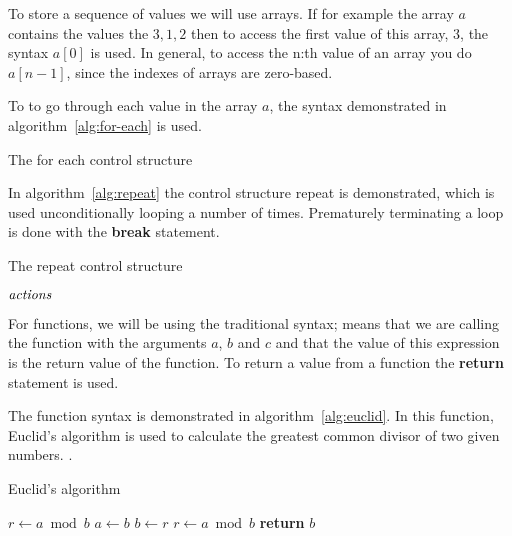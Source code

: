 To store a sequence of values we will use arrays. If for example the
array $a$ contains the values the $3,1,2$ then to access the first
value of this array, $3$, the syntax $a[0]$ is used. In general, to
access the n:th value of an array you do $a[n-1]$, since the indexes
of arrays are zero-based.

To to go through each value in the array $a$, the syntax demonstrated
in algorithm~\ref{alg:for-each} is used.

\begin{algorithm}[H]
  \caption{The for each control structure}
  \label{alg:for-each}
  \begin{algorithmic}[1]
    \EndForEach
  \end{algorithmic}
\end{algorithm}

In algorithm~\ref{alg:repeat} the control structure repeat is
demonstrated, which is used unconditionally looping a number of
times. Prematurely terminating a loop is done with the \textbf{break}
statement.

\begin{algorithm}[H]
  \caption{The repeat control structure}
  \label{alg:repeat}
  \begin{algorithmic}[1]
    \State $\mathit{actions}$ 
    \EndRepeatn
  \end{algorithmic}
\end{algorithm}

For functions, we will be using the traditional syntax;
 means that we are calling the function
 with the arguments $a$, $b$ and $c$ and that the value
of this expression is the return value of the function. To return a
value from a function the \textbf{return} statement is used.

The function syntax is demonstrated in algorithm~\ref{alg:euclid}. In
this function, Euclid's algorithm is used to calculate the greatest
common divisor of two given numbers.
\cite{cormen2009introduction_to_algo,weisstein:_euclid_algor}.

\begin{algorithm}
  \caption{Euclid's algorithm}
  \label{alg:euclid}
  \begin{algorithmic}[1]
    \State $r\gets a\bmod b$
    \State $a\gets b$
    \State $b\gets r$
    \State $r\gets a\bmod b$
    \EndWhile
    \State \textbf{return} $b$
    \EndProcedure
  \end{algorithmic}
\end{algorithm}


